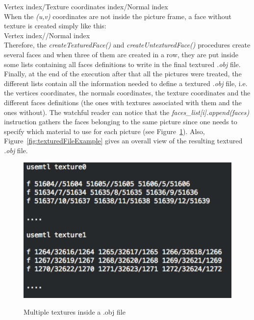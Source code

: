 \noindent Vertex index/Texture coordinates index/Normal index \\

When the \textit{(u,v)} coordinates are not inside the picture frame, a face without texture is created simply like this:\\

\noindent Vertex index//Normal index \\

Therefore, the \textit{createTexturedFace()} and \textit{createUntexturedFace()} procedures create several faces and when three of them are created in a row, they are put inside some lists containing all faces definitions to write in the final textured \textit{.obj} file.\\  

Finally, at the end of the execution after that all the pictures were treated, the different lists contain all the information needed to define a textured \textit{.obj} file, i.e. the vertices coordinates, the normals coordinates, the texture coordinates and the different faces definitions (the ones with textures associated with them and the ones without). The watchful reader can notice that the \textit{faces\_list[i].append(faces)} instruction gathers the faces belonging to the same picture since one needs to specify which material to use for each picture (see Figure~\ref{fig:multipleTextureOBJFile}). Also, Figure~\ref{fig:texturedFileExample} gives an overall view of the resulting textured \textit{.obj} file.

\begin{figure}
\caption{Multiple textures inside a .obj file}
\centering
    \includegraphics[width=1.0\textwidth]{images/multipleTextureOBJFile.png}
\label{fig:multipleTextureOBJFile}
\end{figure}

